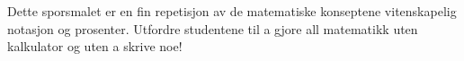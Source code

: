 





Dette sporsmalet er en fin repetisjon av de matematiske konseptene vitenskapelig notasjon og prosenter.  Utfordre studentene til a gjore all matematikk uten kalkulator og uten a skrive noe!




